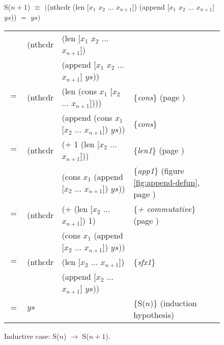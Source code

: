 \begin{figure}
\begin{center}
S($n+1$) $\equiv$ $($\textsf{(nthcdr (len [$x_1$ $x_2$ $\dots$ $x_{n+1}$]) (append [$x_1$ $x_2$ $\dots$ $x_{n+1}$] $ys$))} $=$ $ys)$
\end{center}

\begin{center}
\begin{tabular}{llll}
    & \textsf{(nthcdr} & \textsf{(len [$x_1$ $x_2$ $\dots$ $x_{n+1}$])}                 & \\
    &         & \textsf{(append [$x_1$ $x_2$ $\dots$ $x_{n+1}$] $ys$))}        & \\
$=$ & \textsf{(nthcdr} & \textsf{(len (cons $x_1$ [$x_2$ $\dots$ $x_{n+1}$])))}         & \{\emph{cons}\} (page \pageref{first-rest-cons}) \\
    &         & \textsf{(append (cons $x_1$ [$x_2$ $\dots$ $x_{n+1}$]) $ys$))} & \{\emph{cons}\}                                \\
$=$ & \textsf{(nthcdr} & \textsf{(+ 1 (len [$x_2$ $\dots$ $x_{n+1}$]))}                 & \{\emph{len1}\} (page \pageref{len-equations})       \\
    &         & \textsf{(cons $x_1$ (append [$x_2$ $\dots$ $x_{n+1}$]) $ys$))} & \{\emph{app1}\} (figure \ref{fig:append-defun}, page \pageref{fig:append-defun})\\
$=$ & \textsf{(nthcdr} & \textsf{(+ (len [$x_2$ $\dots$ $x_{n+1}$]) 1)}                 & \{\emph{+ commutative}\} (page \pageref{fig-02-01})  \\
    &         & \textsf{(cons $x_1$ (append [$x_2$ $\dots$ $x_{n+1}$]) $ys$))} &                                                      \\
$=$ & \textsf{(nthcdr} & \textsf{(len [$x_2$ $\dots$ $x_{n+1}$])}                       & \{\emph{sfx1}\}                                      \\
    &         & \textsf{(append [$x_2$ $\dots$ $x_{n+1}$] $ys$))}              &                                                      \\
$=$ & $ys$    &                                                     & \{S($n$)\} (induction hypothesis)\\
\end{tabular}
\end{center}
\caption{Inductive case: S($n$) $\rightarrow$ S($n+1$).}
\label{fig:append-suffix-induc-case}
\end{figure}

